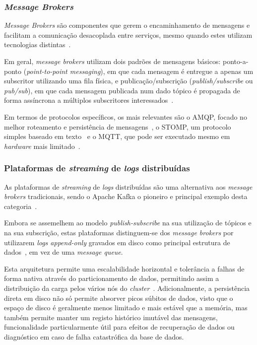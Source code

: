 \subsubsection{\textit{Message Brokers}}

\textit{Message Brokers} são componentes que gerem o encaminhamento de mensagens e facilitam a comunicação desacoplada entre serviços, mesmo quando estes utilizam tecnologias distintas~\cite{IBM_brokers}.

Em geral, \textit{message brokers} utilizam dois padrões de mensagens básicos: ponto-a-ponto (\textit{point-to-point messaging}), em que cada mensagem é entregue a apenas um subscritor utilizando uma fila física, e publicação/subscrição (\textit{publish/subscribe} ou \textit{pub/sub}), em que cada mensagem publicada num dado tópico é propagada de forma assíncrona a múltiplos subscritores interessados~\cite{IBM_brokers}.

Em termos de protocolos específicos, os mais relevantes são o \ac{AMQP}, focado no melhor roteamento e persistência de mensagens~\cite{amqp_mqtt_definitions}, o \ac{STOMP}, um protocolo simples baseado em texto~\cite{STOMP} e o \ac{MQTT}, que pode ser executado mesmo em \textit{hardware} mais limitado~\cite{amqp_mqtt_definitions}.

\subsubsection{Plataformas de \textit{streaming} de \textit{logs} distribuídas}

As plataformas de \textit{streaming} de \textit{logs} distribuídas são uma alternativa aos \textit{message brokers} tradicionais, sendo o Apache Kafka o pioneiro e principal exemplo desta categoria~\cite{Kafka2011}.

Embora se assemelhem ao modelo \textit{publish-subscribe} na sua utilização de tópicos e na sua subscrição, estas plataformas distinguem-se dos \textit{message brokers} por utilizarem \textit{logs append-only} gravados em disco como principal estrutura de dados~\cite{Kafka2011}, em vez de uma \textit{message queue}.

Esta arquitetura permite uma escalabilidade horizontal e tolerância a falhas de forma nativa através do particionamento de dados, permitindo assim a distribuição da carga pelos vários nós do \textit{cluster}~\cite{Kafka2011}.
Adicionalmente, a persistência direta em disco não só permite absorver picos súbitos de dados, visto que o espaço de disco é geralmente menos limitado e mais estável que a memória, mas também permite manter um registo histórico imutável das mensagens, funcionalidade particularmente útil para efeitos de recuperação de dados ou diagnóstico em caso de falha catastrófica da base de dados.

